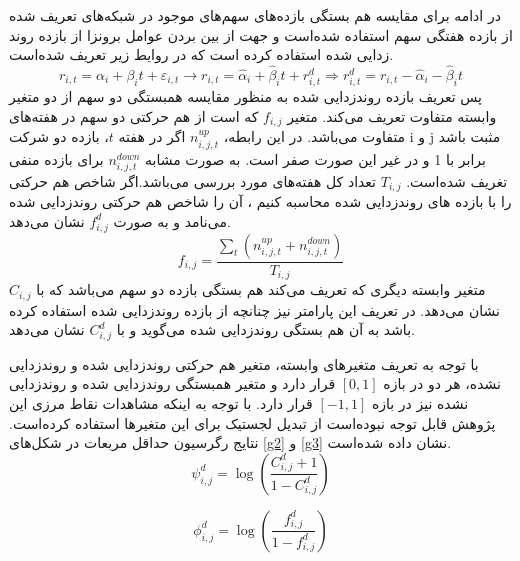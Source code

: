 \documentclass[12pt]{article}
\begin{document}
در ادامه برای مقایسه هم بستگی بازده‌های سهم‌های موجود در شبکه‌های تعریف شده از بازده هفتگی سهم استفاده شده‌است و جهت از بین بردن عوامل برونزا از بازده روند زدایی شده استفاده کرده است که در روایط زیر تعریف شده‌است.
\begin{equation}
r_{i,t} = \alpha_i +\beta_i t + \varepsilon_{i,t} \rightarrow r_{i,t} = \hat{\alpha}_i +\hat{\beta}_i t + r^d_{i,t} \Rightarrow r^d_{i,t} = r_{i,t} -\hat{\alpha}_i -\hat{\beta}_i t 
\end{equation}
پس تعریف بازده روندزدایی شده به منظور مقایسه همبستگی دو سهم از دو متغیر وابسته متفاوت تعریف می‌کند. متغیر $ f_{i,j} $ که است از هم حرکتی دو سهم در هفته‌های متفاوت می‌باشد. در این رابطه، $ n_{i,j,t}^{up} $ اگر در هفته $ t $، بازده دو شرکت i و j مثبت باشد برابر با 1 و در غیر این صورت صفر است. به صورت مشابه $ n_{i,j,t}^{down} $ برای بازده منفی تغریف شده‌است. $ T_{i,j} $ تعداد کل هفته‌های مورد بررسی می‌باشد.اگر شاخص هم حركتی را با بازده های روندزدایی شده محاسبه كنیم ، آن را شاخص هم حركتی
 روندزدایی شده می‌نامد و به صورت $ f^d_{i,j} $ نشان می‌دهد.
\begin{equation}
f_{i,j}  = \frac{\sum_t (n_{i,j,t}^{up}+n_{i,j,t}^{down})}{T_{i,j}}
\end{equation}
متغیر وابسته دیگری که تعریف می‌کند هم بستگی بازده دو سهم می‌باشد که با $ C_{i,j} $ نشان می‌دهد. در تعریف این پارامتر نیز چنانچه از بازده روندزدایی شده استفاده کرده باشد به آن هم بستگی روندزدایی شده می‌گوید و با $ C^d_{i,j} $ نشان می‌دهد.

با توجه به تعریف متغیر‌های وابسته، متغیر هم حركتی روندزدایی شده و روندزدایی نشده، هر دو در بازه $ [0,1] $ قرار دارد و متغیر همبستگی روندزدایی شده و روندزدایی نشده نیز در بازه $ [-1,1] $ قرار دارد. با توجه به اینکه مشاهدات نقاط مرزی این پژوهش قابل توجه نبوده‌است از تبدیل لجستیک برای این متغیر‌ها استفاده کرده‌است. نتایج رگرسیون حداقل مربعات در شکل‌های 
\ref{g2} 
و
\ref{g3}
نشان داده شده‌است.
\begin{equation}
\psi_{i,j}^d = \log(\frac{C^d_{i,j}+1}{1-C^d_{i,j}})
\end{equation}

\begin{equation}
\phi_{i,j}^d = \log(\frac{f^d_{i,j}}{1-f^d_{i,j}})
\end{equation}
\end{document}
